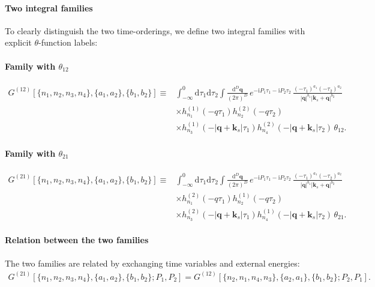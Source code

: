 \documentclass[a4paper,12pt]{article}
\newcommand{\FR}[2]{\displaystyle\frac{\,{#1}\,}{#2}}
\def\di{{\mathrm{d}}}
\def\mb{\mathbf}
\def\ii{\mathrm{i}}
\begin{document}
\paragraph{Two integral families} To clearly distinguish the two time-orderings, we define two integral families with explicit $\theta$-function labels:

\paragraph{Family with $\theta_{12}$}
\begin{align}
	G^{(12)}[\{n_1,n_2,n_3,n_4\},\{a_1,a_2\},\{b_1,b_2\}] \equiv & \int_{-\infty}^0 \di\tau_1\di\tau_2 \int \FR{\di^D \mb q}{(2\pi)^D}\, e^{-\ii P_1\tau_1 - \ii P_2 \tau_2}\,
	\frac{(-\tau_1)^{a_1}(-\tau_2)^{a_2}}{|\mb q|^{b_1}|\mb k_s+\mb q|^{b_2}} \nonumber \\
	& \times h_{n_1}^{(1)}(-q\tau_1)h_{n_2}^{(2)}(-q\tau_2)\nonumber\\
	& \times h_{n_3}^{(1)}(-|\mb q+\mb k_s|\tau_1)h_{n_4}^{(2)}(-|\mb q+\mb k_s|\tau_2)\,\theta_{12}.
\end{align}

\paragraph{Family with $\theta_{21}$}
\begin{align}
	G^{(21)}[\{n_1,n_2,n_3,n_4\},\{a_1,a_2\},\{b_1,b_2\}] \equiv & \int_{-\infty}^0 \di\tau_1\di\tau_2 \int \FR{\di^D \mb q}{(2\pi)^D}\, e^{-\ii P_1\tau_1 - \ii P_2 \tau_2}\,
	\frac{(-\tau_1)^{a_1}(-\tau_2)^{a_2}}{|\mb q|^{b_1}|\mb k_s+\mb q|^{b_2}} \nonumber \\
	& \times h_{n_1}^{(2)}(-q\tau_1)h_{n_2}^{(1)}(-q\tau_2)\nonumber\\
	& \times h_{n_3}^{(2)}(-|\mb q+\mb k_s|\tau_1)h_{n_4}^{(1)}(-|\mb q+\mb k_s|\tau_2)\,\theta_{21}.
\end{align}

\paragraph{Relation between the two families}
The two families are related by exchanging time variables and external energies:
\begin{align}
	G^{(21)}[\{n_1,n_2,n_3,n_4\},\{a_1,a_2\},\{b_1,b_2\}; P_1,P_2] = G^{(12)}[\{n_2,n_1,n_4,n_3\},\{a_2,a_1\},\{b_1,b_2\}; P_2,P_1].
\end{align}
\end{document}
